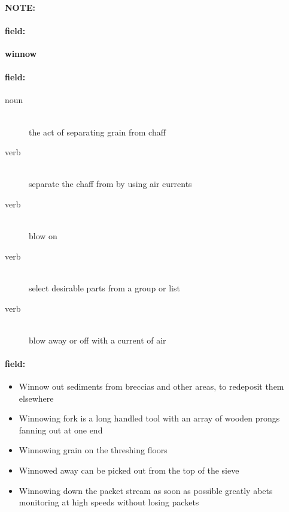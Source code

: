 \documentclass[12pt]{article}
\newenvironment{note}{\paragraph{NOTE:}}{}
\newenvironment{field}{\paragraph{field:}}{}
\begin{document}
\begin{note}
\begin{field}
\textbf{\large winnow}
\end{field}


\begin{field}
\begin{description}
\item[noun] \hfill \\ 
the act of separating grain from chaff

\item[verb] \hfill \\ 
separate the chaff from by using air currents

\item[verb] \hfill \\ 
blow on

\item[verb] \hfill \\ 
select desirable parts from a group or list

\item[verb] \hfill \\ 
blow away or off with a current of air

\end{description}
\end{field}

\begin{field}
\begin{itemize}
\item Winnow out sediments from breccias and other areas, to redeposit them elsewhere
\item Winnowing fork is a long handled tool with an array of wooden prongs fanning out at one end
\item Winnowing grain on the threshing floors
\item Winnowed away can be picked out from the top of the sieve
\item Winnowing down the packet stream as soon as possible greatly abets monitoring at high speeds without losing packets
\end{itemize}
\end{field}
\end{note}
\end{document}
